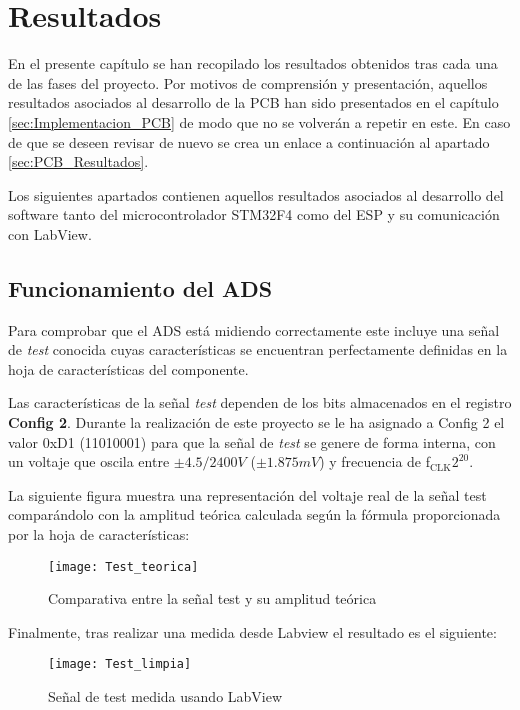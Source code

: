 \chapter{Resultados\label{sec:Resultados}}

En el presente capítulo se han recopilado los resultados obtenidos tras cada una de las fases del proyecto. Por motivos de comprensión y presentación, aquellos resultados asociados al desarrollo de la PCB han sido presentados en el capítulo \ref{sec:Implementacion_PCB} de modo que no se volverán a repetir en este. En caso de que se deseen revisar de nuevo se crea un enlace a continuación al apartado \ref{sec:PCB_Resultados}.

Los siguientes apartados contienen aquellos resultados asociados al desarrollo del software tanto del microcontrolador STM32F4 como del ESP y su comunicación con LabView.

\section{Funcionamiento del ADS\label{Resultados_ADS}}

Para comprobar que el ADS está midiendo correctamente este incluye una señal de \textit{test} conocida cuyas características se encuentran perfectamente definidas en la hoja de características del componente.

Las características de la señal \textit{test} dependen de los bits almacenados en el registro \textbf{Config 2}. Durante la realización de este proyecto se le ha asignado a Config 2 el valor 0xD1 (11010001) para que la señal de \textit{test} se genere de forma interna, con un voltaje que oscila entre $\pm4.5/2400V$ ($\pm1.875mV$) y frecuencia de f$_\text{CLK}$\/$2^{20}$.

La siguiente figura muestra una representación del voltaje real de la señal test comparándolo con la amplitud teórica calculada según la fórmula proporcionada por la hoja de características:

\begin{figure} [H]
    \centering
    \texttt{[image: Test\_teorica]}
    \caption{Comparativa entre la señal test y su amplitud teórica}
    \label{fig:tes_teorica}
\end{figure}

Finalmente, tras realizar una medida desde Labview el resultado es el siguiente:

\begin{figure} [H]
    \centering
    \texttt{[image: Test\_limpia]}
    \caption{Señal de test medida usando LabView}
    \label{fig:Test_limpia}
\end{figure}

